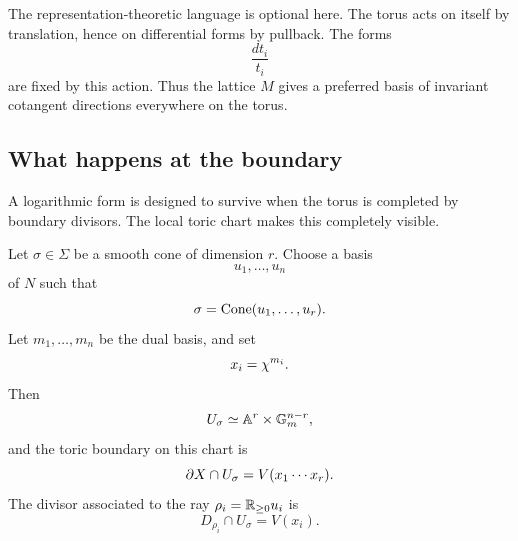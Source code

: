 \begin{observation}
The representation-theoretic language is optional here. The torus
acts on itself by translation, hence on differential forms by
pullback. The forms
\[
\frac{dt_i}{t_i}
\]
are fixed by this action. Thus the lattice \(M\) gives a preferred
basis of invariant cotangent directions everywhere on the torus.
\end{observation}

\subsection{What happens at the boundary}

A logarithmic form is designed to survive when the torus is completed
by boundary divisors. The local toric chart makes this completely
visible.

Let \(\sigma\in\Sigma\) be a smooth cone of dimension \(r\). Choose a
basis
\[
u_1,\dots,u_n
\]
of \(N\) such that
\[
\sigma=\operatorname{Cone}(u_1,\dots,u_r).
\]
Let \(m_1,\dots,m_n\) be the dual basis, and set
\[
x_i=\chi^{m_i}.
\]
Then
\[
U_\sigma
\simeq
\mathbb{A}^r\times\mathbb{G}_{m}^{n-r},
\]
and the toric boundary on this chart is
\[
\partial X\cap U_\sigma
=
V(x_1\cdots x_r).
\]
The divisor associated to the ray \(\rho_i=\mathbb{R}_{\geq0}u_i\) is
\[
D_{\rho_i}\cap U_\sigma=V(x_i).
\]

